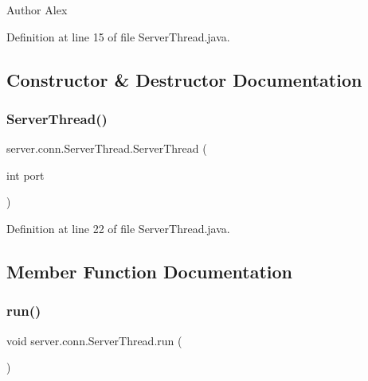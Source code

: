 \begin{DoxyAuthor}{Author}
Alex 
\end{DoxyAuthor}


Definition at line 15 of file Server\+Thread.\+java.



\subsection{Constructor \& Destructor Documentation}
\hypertarget{classserver_1_1conn_1_1_server_thread_af828429a6a24354091d0c72a611d8886}{}\label{classserver_1_1conn_1_1_server_thread_af828429a6a24354091d0c72a611d8886} 
\subsubsection{\texorpdfstring{Server\+Thread()}{ServerThread()}}
{\footnotesize\ttfamily server.\+conn.\+Server\+Thread.\+Server\+Thread (\begin{DoxyParamCaption}\item[{int}]{port }\end{DoxyParamCaption})}



Definition at line 22 of file Server\+Thread.\+java.



\subsection{Member Function Documentation}
\hypertarget{classserver_1_1conn_1_1_server_thread_a1138f0c399d99cf4c00277ad1e7b2984}{}\label{classserver_1_1conn_1_1_server_thread_a1138f0c399d99cf4c00277ad1e7b2984} 
\subsubsection{\texorpdfstring{run()}{run()}}
{\footnotesize\ttfamily void server.\+conn.\+Server\+Thread.\+run (\begin{DoxyParamCaption}{ }\end{DoxyParamCaption})}



